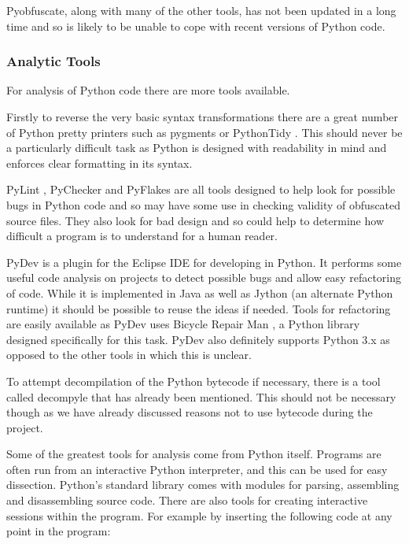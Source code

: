 \documentclass{report}
\begin{document}
Pyobfuscate, along with many of the other tools, has not been updated in a long time and so is likely to be unable to cope with
recent versions of Python code.

\subsubsection{Analytic Tools}

For analysis of Python code there are more tools available.

Firstly to reverse the very basic syntax transformations there are a great number of Python pretty printers such as
pygments \cite{pygments} or PythonTidy \cite{pythontidy}. This should never be a particularly difficult task as Python is
designed with readability in mind and enforces clear formatting in its syntax.

PyLint \cite{pylint}, PyChecker \cite{pychecker} and PyFlakes \cite{pyflakes} are all tools designed to help look for possible
bugs in Python code and so may have some use in checking validity of obfuscated source files. They also look for bad design and so
could help to determine how difficult a program is to understand for a human reader.

PyDev \cite{pydev} is a plugin for the Eclipse IDE for developing in Python. It performs some useful code analysis on projects to detect
possible bugs and allow easy refactoring of code. While it is implemented in Java as well as Jython (an alternate Python runtime)
it should be possible to reuse the ideas if needed. Tools for refactoring are easily available as PyDev uses Bicycle Repair
Man \cite{bikerepair}, a Python library designed specifically for this task. PyDev also definitely supports Python 3.x as opposed to the
other tools in which this is unclear.

To attempt decompilation of the Python bytecode if necessary, there is a tool called decompyle \cite{decompyle} that has already been
mentioned. This should not be necessary though as we have already discussed reasons not to use bytecode during the project.

Some of the greatest  tools for analysis come from Python itself. Programs are often run from an interactive Python interpreter, and this
can be used for easy dissection. Python's standard library comes with modules for parsing, assembling and disassembling source code.
There are also tools for creating interactive sessions within the program. For example by inserting the following code at any point
in the program:
\end{document}
